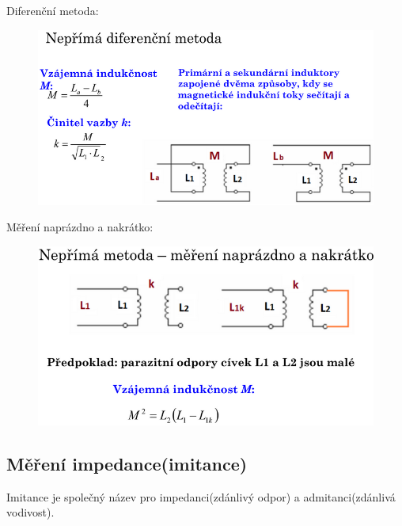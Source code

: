Diferenční metoda:\\
\begin{figure}[h!]
    \centering
    \includegraphics[scale = 0.5]{images/VzLDiff.png}
\end{figure}
\newpage
Měření naprázdno a nakrátko:\\
\begin{figure}[h!]
    \centering
    \includegraphics[scale = 0.5]{images/VzLNN.png}
\end{figure}

\subsection{Měření impedance(imitance)}
Imitance je společný název pro impedanci(zdánlivý odpor) a admitanci(zdánlivá vodivost).\\

